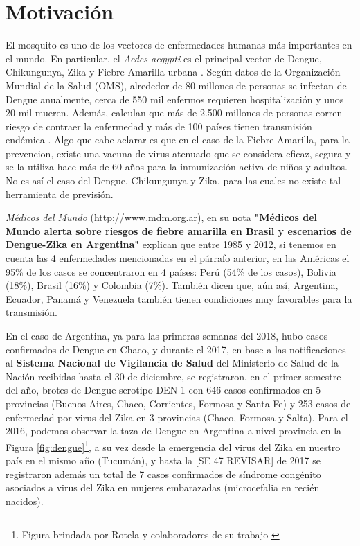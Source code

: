 %
%
%

\chapter{Motivación}

\justifying
  \par El mosquito es uno de los vectores de enfermedades humanas más importantes
    en el mundo. En particular, el \textit{Aedes aegypti} es el principal vector
    de Dengue, Chikungunya, Zika y Fiebre Amarilla urbana \cite{dengue_principal}.
    Según datos de la Organización Mundial de la Salud (OMS), alrededor de 80 millones de
    personas se infectan de Dengue anualmente, cerca de 550 mil enfermos requieren hospitalización y
    unos 20 mil mueren. Además, calculan que más de 2.500 millones de personas corren
    riesgo de contraer la enfermedad y más de 100 países tienen transmisión endémica
    \cite{directices_ministerio}.
    Algo que cabe aclarar es que en el caso de la Fiebre Amarilla, para la
    prevencion, existe una vacuna de virus atenuado que se considera eficaz, segura
    y se la utiliza hace más de 60 años para la inmunización activa de niños y
    adultos. No es así el caso del Dengue, Chikungunya y Zika, para las cuales
    no existe tal herramienta de previsión.

  \par \textit{Médicos del Mundo} (http://www.mdm.org.ar), en su nota
    \textbf{"Médicos del Mundo alerta sobre riesgos de fiebre amarilla en Brasil y escenarios de Dengue-Zika en Argentina"}
    explican que entre 1985 y 2012, si tenemos en cuenta las 4 enfermedades
    mencionadas en el párrafo anterior, en las Américas el 95\% de los casos se concentraron en
    4 países: Perú (54\% de los casos), Bolivia (18\%), Brasil (16\%) y Colombia (7\%).
    También dicen que, aún así, Argentina, Ecuador, Panamá y Venezuela también tienen condiciones
    muy favorables para la transmisión.


  \par En el caso de Argentina, ya para las primeras semanas del 2018, hubo casos confirmados
    de Dengue en Chaco, y durante el 2017, en base a las notificaciones al
    \textbf{Sistema Nacional de Vigilancia de Salud} del Ministerio de Salud de la Nación
    recibidas hasta el 30 de diciembre, se registraron, en el primer semestre del año, brotes de
    Dengue serotipo DEN-1 con 646 casos confirmados en 5 provincias
    (Buenos Aires, Chaco, Corrientes, Formosa y Santa Fe) y 253 casos de enfermedad
    por virus del Zika en 3 provincias (Chaco, Formosa y Salta). Para el 2016,
    podemos observar la taza de Dengue en Argentina a nivel provincia \cite{analisis_cordoba}
    en la Figura \ref{fig:dengue}\footnote{Figura brindada por Rotela y
    colaboradores de su trabajo \cite{analisis_cordoba}}, a su vez desde la emergencia del virus del Zika en
    nuestro país en el mismo año (Tucumán), y hasta
    la [SE 47 REVISAR] de 2017 se registraron además un total de 7 casos confirmados de
    síndrome congénito asociados a virus del Zika en mujeres embarazadas
    (microcefalia en recién nacidos).



